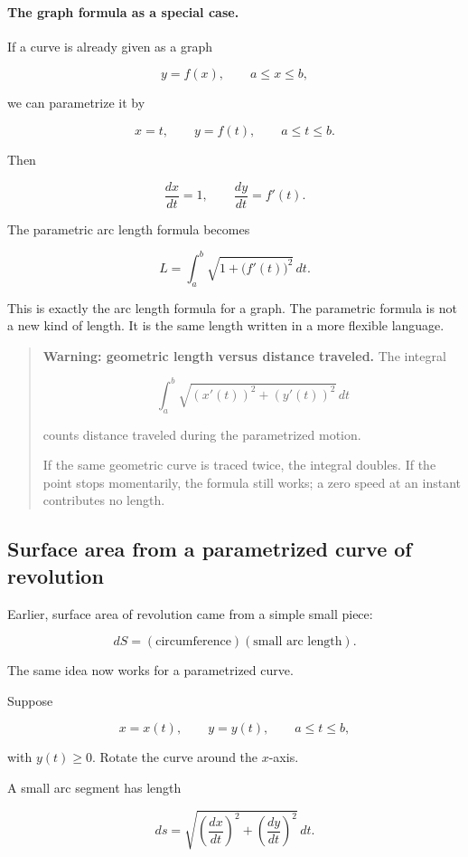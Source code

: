\paragraph{The graph formula as a special case.}
If a curve is already given as a graph

\[
y=f(x),
\qquad
a\le x\le b,
\]

we can parametrize it by

\[
x=t,
\qquad
y=f(t),
\qquad
a\le t\le b.
\]

Then

\[
\frac{dx}{dt}=1,
\qquad
\frac{dy}{dt}=f'(t).
\]

The parametric arc length formula becomes

\[
L=\int_a^b \sqrt{1+\bigl(f'(t)\bigr)^2}\,dt.
\]

This is exactly the arc length formula for a graph.  The parametric formula is not a new
kind of length.  It is the same length written in a more flexible language.

\begin{quote}
\textbf{Warning: geometric length versus distance traveled.}
The integral

\[
\int_a^b
\sqrt{(x'(t))^2+(y'(t))^2}\,dt
\]

counts distance traveled during the parametrized motion.

If the same geometric curve is traced twice, the integral doubles.  If the point stops
momentarily, the formula still works; a zero speed at an instant contributes no length.
\end{quote}

\subsection{Surface area from a parametrized curve of revolution}
\label{subsec:parametric-surface-area-revolution}

Earlier, surface area of revolution came from a simple small piece:

\[
dS=(\text{circumference})(\text{small arc length}).
\]

The same idea now works for a parametrized curve.

Suppose

\[
x=x(t),
\qquad
y=y(t),
\qquad
a\le t\le b,
\]

with \(y(t)\ge0\).  Rotate the curve around the \(x\)-axis.

A small arc segment has length

\[
ds=
\sqrt{\left(\frac{dx}{dt}\right)^2+
      \left(\frac{dy}{dt}\right)^2}\,dt.
\]

